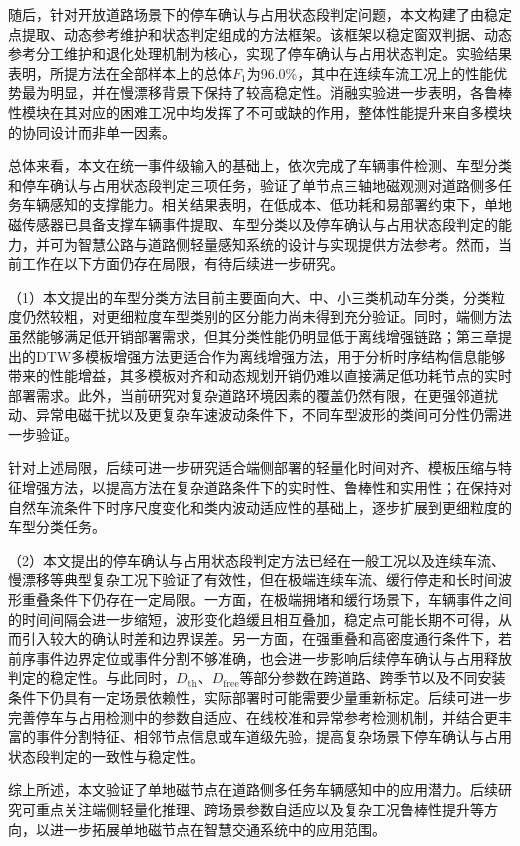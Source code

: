 \documentclass{xdupgthesis}
\begin{document}
随后，针对开放道路场景下的停车确认与占用状态段判定问题，本文构建了由稳定点提取、动态参考维护和状态判定组成的方法框架。该框架以稳定窗双判据、动态参考分工维护和退化处理机制为核心，实现了停车确认与占用状态判定。实验结果表明，所提方法在全部样本上的总体$F_1$为96.0\%，其中在连续车流工况上的性能优势最为明显，并在慢漂移背景下保持了较高稳定性。消融实验进一步表明，各鲁棒性模块在其对应的困难工况中均发挥了不可或缺的作用，整体性能提升来自多模块的协同设计而非单一因素。

总体来看，本文在统一事件级输入的基础上，依次完成了车辆事件检测、车型分类和停车确认与占用状态段判定三项任务，验证了单节点三轴地磁观测对道路侧多任务车辆感知的支撑能力。相关结果表明，在低成本、低功耗和易部署约束下，单地磁传感器已具备支撑车辆事件提取、车型分类以及停车确认与占用状态段判定的能力，并可为智慧公路与道路侧轻量感知系统的设计与实现提供方法参考。然而，当前工作在以下方面仍存在局限，有待后续进一步研究。

（1）本文提出的车型分类方法目前主要面向大、中、小三类机动车分类，分类粒度仍然较粗，对更细粒度车型类别的区分能力尚未得到充分验证。同时，端侧方法虽然能够满足低开销部署需求，但其分类性能仍明显低于离线增强链路；第三章提出的DTW多模板增强方法更适合作为离线增强方法，用于分析时序结构信息能够带来的性能增益，其多模板对齐和动态规划开销仍难以直接满足低功耗节点的实时部署需求。此外，当前研究对复杂道路环境因素的覆盖仍然有限，在更强邻道扰动、异常电磁干扰以及更复杂车速波动条件下，不同车型波形的类间可分性仍需进一步验证。

针对上述局限，后续可进一步研究适合端侧部署的轻量化时间对齐、模板压缩与特征增强方法，以提高方法在复杂道路条件下的实时性、鲁棒性和实用性；在保持对自然车流条件下时序尺度变化和类内波动适应性的基础上，逐步扩展到更细粒度的车型分类任务。

（2）本文提出的停车确认与占用状态段判定方法已经在一般工况以及连续车流、慢漂移等典型复杂工况下验证了有效性，但在极端连续车流、缓行停走和长时间波形重叠条件下仍存在一定局限。一方面，在极端拥堵和缓行场景下，车辆事件之间的时间间隔会进一步缩短，波形变化趋缓且相互叠加，稳定点可能长期不可得，从而引入较大的确认时差和边界误差。另一方面，在强重叠和高密度通行条件下，若前序事件边界定位或事件分割不够准确，也会进一步影响后续停车确认与占用释放判定的稳定性。与此同时，$D_{\mathrm{th}}$、$D_{\mathrm{free}}$等部分参数在跨道路、跨季节以及不同安装条件下仍具有一定场景依赖性，实际部署时可能需要少量重新标定。后续可进一步完善停车与占用检测中的参数自适应、在线校准和异常参考检测机制，并结合更丰富的事件分割特征、相邻节点信息或车道级先验，提高复杂场景下停车确认与占用状态段判定的一致性与稳定性。

综上所述，本文验证了单地磁节点在道路侧多任务车辆感知中的应用潜力。后续研究可重点关注端侧轻量化推理、跨场景参数自适应以及复杂工况鲁棒性提升等方向，以进一步拓展单地磁节点在智慧交通系统中的应用范围。
\end{document}
